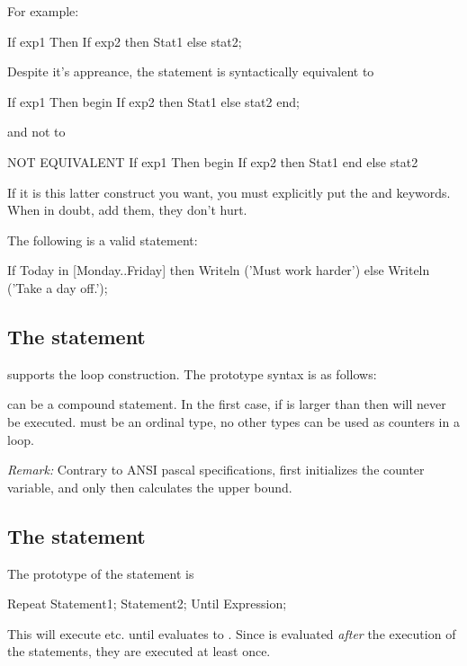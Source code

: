 \documentclass{report}
\begin{document}
For example:
\begin{listing}
If exp1 Then 
  If exp2 then 
    Stat1 
else 
  stat2;
\end{listing} 
Despite it's appreance, the statement is syntactically equivalent to
\begin{listing}
If exp1 Then
   begin 
   If exp2 then 
      Stat1 
   else 
      stat2
   end;
\end{listing}
and not to 
\begin{listing}
{ NOT EQUIVALENT }
If exp1 Then
   begin 
   If exp2 then 
      Stat1 
   end
else 
   stat2
\end{listing}
If it is this latter construct you want, you must explicitly put the
 and  keywords. When in doubt, add them, they don't
hurt.

The following is a valid statement:
\begin{listing}
If Today in [Monday..Friday] then
  Writeln ('Must work harder')
else
  Writeln ('Take a day off.');
\end{listing}

\subsection{The  statement}

\fpc supports the  loop construction. The prototype syntax is as
follows:



 can be a compound statement. In the first case, if
 is larger than  then  will
never be executed.  must be an ordinal type, no other types can
be used as counters in a loop.

{\em Remark:} Contrary to ANSI pascal specifications, \fpc first initializes
the counter variable, and only then calculates the upper bound.



\subsection{The  statement}
The prototype of the  statement is
\begin{listing}
Repeat
  Statement1;
  Statement2;
Until Expression;
\end{listing}
This will execute  etc. until  evaluates to
. Since  is evaluated {\em after} the execution of the
statements, they are executed at least once.
\end{document}
